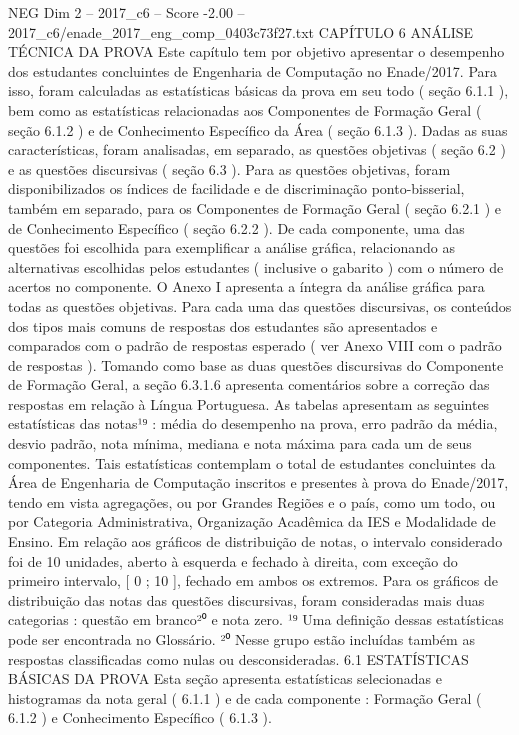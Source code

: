 \begin{textsample}{NEG Dim 2 – 2017\_c6 – Score -2.00 – 2017\_c6/enade\_2017\_eng\_comp\_0403c73f27.txt}  \label{ex:f2_neg_167}
CAPÍTULO 6 ANÁLISE TÉCNICA DA PROVA Este capítulo tem por objetivo apresentar o desempenho dos estudantes concluintes de Engenharia de Computação no Enade/2017.
Para isso, foram calculadas as estatísticas básicas da prova em seu todo ( seção 6.1.1 ), bem como as estatísticas relacionadas aos Componentes de Formação Geral ( seção 6.1.2 ) e de Conhecimento Específico da Área ( seção 6.1.3 ).
Dadas as suas características, foram analisadas, em separado, as questões objetivas ( seção 6.2 ) e as questões discursivas ( seção 6.3 ).
Para as questões objetivas, foram disponibilizados os índices de facilidade e de discriminação ponto-bisserial, também em separado, para os Componentes de Formação Geral ( seção 6.2.1 ) e de Conhecimento Específico ( seção 6.2.2 ).
De cada componente, uma das questões foi escolhida para exemplificar a análise gráfica, relacionando as alternativas escolhidas pelos estudantes ( inclusive o gabarito ) com o número de acertos no componente.
O Anexo I apresenta a íntegra da análise gráfica para todas as questões objetivas.
Para cada uma das questões discursivas, os conteúdos dos tipos mais comuns de respostas dos estudantes são apresentados e comparados com o padrão de respostas esperado ( ver Anexo VIII com o padrão de respostas ).
Tomando como base as duas questões discursivas do Componente de Formação Geral, a seção 6.3.1.6 apresenta comentários sobre a correção das respostas em relação à Língua Portuguesa.
As tabelas apresentam as seguintes estatísticas das notas¹⁹ : média do desempenho na prova, erro padrão da média, desvio padrão, nota mínima, mediana e nota máxima para cada um de seus componentes.
Tais estatísticas contemplam o total de estudantes concluintes da Área de Engenharia de Computação inscritos e presentes à prova do Enade/2017, tendo em vista agregações, ou por Grandes Regiões e o país, como um todo, ou por Categoria Administrativa, Organização Acadêmica da IES e Modalidade de Ensino.
Em relação aos gráficos de distribuição de notas, o intervalo considerado foi de 10 unidades, aberto à esquerda e fechado à direita, com exceção do primeiro intervalo, [ 0 ; 10 ], fechado em ambos os extremos.
Para os gráficos de distribuição das notas das questões discursivas, foram consideradas mais duas categorias : questão em branco²⁰ e nota zero. ¹⁹ Uma definição dessas estatísticas pode ser encontrada no Glossário. ²⁰ Nesse grupo estão incluídas também as respostas classificadas como nulas ou desconsideradas. 6.1 ESTATÍSTICAS BÁSICAS DA PROVA Esta seção apresenta estatísticas selecionadas e histogramas da nota geral ( 6.1.1 ) e de cada componente : Formação Geral ( 6.1.2 ) e Conhecimento Específico ( 6.1.3 ).

\end{textsample}
